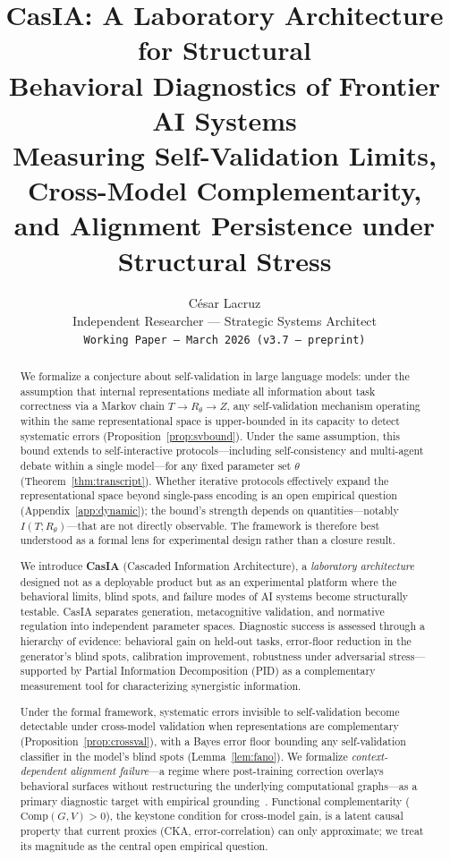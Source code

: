 \documentclass[11pt,a4paper]{article}
\title{%
\textbf{CasIA: A Laboratory Architecture for Structural\\
Behavioral Diagnostics of Frontier AI Systems}\\[6pt]
\large Measuring Self-Validation Limits, Cross-Model Complementarity,\\
and Alignment Persistence under Structural Stress
}
\author{
C\'esar Lacruz\\
Independent Researcher --- Strategic Systems Architect\\
\texttt{Working Paper --- March 2026 (v3.7 --- preprint)}
}
\date{}
\theoremstyle{definition}
\begin{document}
\maketitle

\begin{abstract}
We formalize a conjecture about self-validation in large language models: under the assumption that internal representations mediate all information about task correctness via a Markov chain $T \to R_\theta \to Z$, any self-validation mechanism operating within the same representational space is upper-bounded in its capacity to detect systematic errors (Proposition~\ref{prop:svbound}). Under the same assumption, this bound extends to self-interactive protocols---including self-consistency and multi-agent debate within a single model---for any fixed parameter set $\theta$ (Theorem~\ref{thm:transcript}). Whether iterative protocols effectively expand the representational space beyond single-pass encoding is an open empirical question (Appendix~\ref{app:dynamic}); the bound's strength depends on quantities---notably $I(T; R_\theta)$---that are not directly observable. The framework is therefore best understood as a formal lens for experimental design rather than a closure result.

We introduce \textbf{CasIA} (Cascaded Information Architecture), a \emph{laboratory architecture} designed not as a deployable product but as an experimental platform where the behavioral limits, blind spots, and failure modes of AI systems become structurally testable. CasIA separates generation, metacognitive validation, and normative regulation into independent parameter spaces. Diagnostic success is assessed through a hierarchy of evidence: behavioral gain on held-out tasks, error-floor reduction in the generator's blind spots, calibration improvement, robustness under adversarial stress---supported by Partial Information Decomposition (PID) as a complementary measurement tool for characterizing synergistic information.

Under the formal framework, systematic errors invisible to self-validation become detectable under cross-model validation when representations are complementary (Proposition~\ref{prop:crossval}), with a Bayes error floor bounding any self-validation classifier in the model's blind spots (Lemma~\ref{lem:fano}). We formalize \emph{context-dependent alignment failure}---a regime where post-training correction overlays behavioral surfaces without restructuring the underlying computational graphs---as a primary diagnostic target with empirical grounding~\cite{anthropic2025alignment,payne2026nuclear}. Functional complementarity ($\mathrm{Comp}(G,V) > 0$), the keystone condition for cross-model gain, is a latent causal property that current proxies (CKA, error-correlation) can only approximate; we treat its magnitude as the central open empirical question.


\end{abstract}
\end{document}
